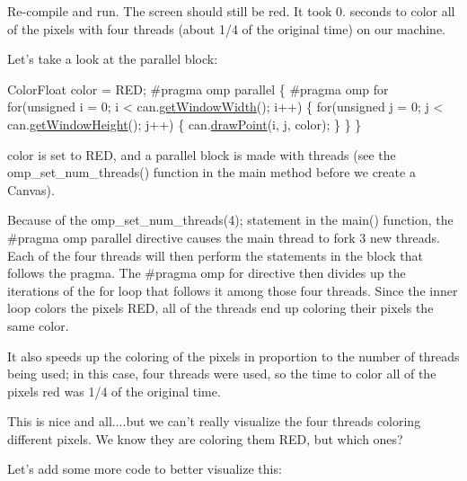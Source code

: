 Re-\/compile and run. The screen should still be red. It took 0. seconds to color all of the pixels with four threads (about 1/4 of the original time) on our machine.

Let's take a look at the parallel block\-:


\begin{DoxyCode}
ColorFloat color = RED;
\textcolor{preprocessor}{#pragma omp parallel}
\textcolor{preprocessor}{}\{
\textcolor{preprocessor}{  #pragma omp for}
\textcolor{preprocessor}{}  \textcolor{keywordflow}{for}(\textcolor{keywordtype}{unsigned} i = 0; i < can.\hyperlink{classtsgl_1_1_canvas_a086a0322f4a6ab27da6929b1aa0593af}{getWindowWidth}(); i++) \{
     \textcolor{keywordflow}{for}(\textcolor{keywordtype}{unsigned} j = 0; j < can.\hyperlink{classtsgl_1_1_canvas_ad740ebe5d6bd69ab79cde3e84f369f35}{getWindowHeight}(); j++) \{
        can.\hyperlink{classtsgl_1_1_canvas_a6c17c90cd13f7b0184a25e4acc2b7426}{drawPoint}(i, j, color);
     \}
  \}
\}
\end{DoxyCode}


{\ttfamily color} is set to {\ttfamily R\-E\-D}, and a parallel block is made with {} threads (see the {\ttfamily omp\-\_\-set\-\_\-num\-\_\-threads()} function in the main method before we create a Canvas).

Because of the {\ttfamily omp\-\_\-set\-\_\-num\-\_\-threads(4);} statement in the {\ttfamily main()} function, the {\ttfamily \#pragma omp parallel} directive causes the main thread to fork 3 new threads. Each of the four threads will then perform the statements in the block that follows the {\ttfamily pragma}. The {\ttfamily \#pragma omp for} directive then divides up the iterations of the {\ttfamily for} loop that follows it among those four threads. Since the inner loop colors the pixels {\ttfamily R\-E\-D}, all of the threads end up coloring their pixels the same color.

It also speeds up the coloring of the pixels in proportion to the number of threads being used; in this case, four threads were used, so the time to color all of the pixels red was 1/4 of the original time.

This is nice and all....but we can't really visualize the four threads coloring different pixels. We know they are coloring them {\ttfamily R\-E\-D}, but which ones?

Let's add some more code to better visualize this\-:


